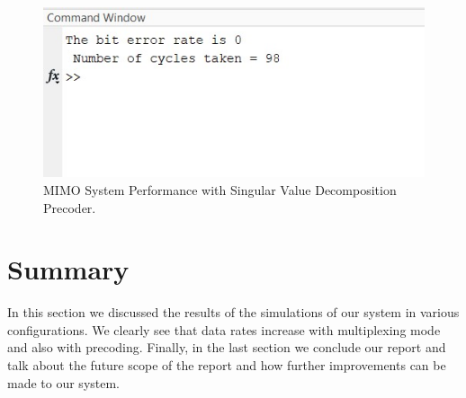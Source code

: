 \begin{figure}[!htbp]
\centering
\includegraphics[scale=1]{Chapter 4/Figures/MIMO System Performance Inverse Channel Estimation}
\caption{MIMO System Performance with Singular Value Decomposition Precoder.}
\label{fig:mimo system performance singular value decomposition}
\end{figure}

\section*{Summary}
In this section we discussed the results of the simulations of our system in various configurations. We clearly see that data rates increase with multiplexing mode and also with precoding. Finally, in the last section we conclude our report and talk about the future scope of the report and how further improvements can be made to our system.





